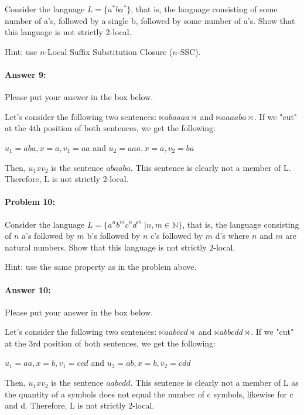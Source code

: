 \documentclass[10pt]{article}
\newenvironment{AnswerBox}{\begin{mdframed}[style=simple]}{\end{mdframed}}
\begin{document}
Consider the language $L=\{a^* b a^*\}$, that is, the language
consisting of some number of a's, followed by a single b, followed by
some number of a's. Show that this language is not strictly
$2$-local.

 Hint: use $n$-Local Suffix Substitution Closure ($n$-SSC).

\paragraph{Answer 9:} Please put your answer in the box below.


\begin{AnswerBox}%
Let's consider the following two sentences: $\ltimes abaaaa \rtimes$ and $\ltimes aaaaba \rtimes$. If we "cut" at the 4th position of both sentences, we get the following:

$u_{1} = aba, x = a, v_{1} = aa$ and $u_{2} = aaa, x = a, v_{2} = ba$

Then, $u_{1} x v_{2}$ is the sentence $abaaba$. This sentence is clearly not a member of L. Therefore, L is not strictly 2-local.

    
\end{AnswerBox}%


\hrulefill %

\paragraph{Problem 10:}

Consider the language
$L= \{a^n b^m c^n d^m\ | n, m \in \mathbb{N} \}$, that is, the
language consisting of $n$ a's followed by $m$ b's followed by $n$ c's
followed by $m$ d's where $n$ and $m$ are
natural numbers. Show that this language is not strictly $2$-local.

 Hint: use the same property as in the problem above.

\paragraph{Answer 10:} Please put your answer in the box below.


\begin{AnswerBox}%

Let's consider the following two sentences: $\ltimes aabccd \rtimes$ and $\ltimes abbcdd \rtimes$. If we "cut" at the 3rd position of both sentences, we get the following:

$u_{1} = aa, x = b, v_{1} = ccd$ and $u_{2} = ab, x = b, v_{2} = cdd$

Then, $u_{1} x v_{2}$ is the sentence $aabcdd$. This sentence is clearly not a member of L as the quantity of a symbols does not equal the number of c symbols, likewise for c and d. Therefore, L is not strictly 2-local.

    
\end{AnswerBox}%
\end{document}

